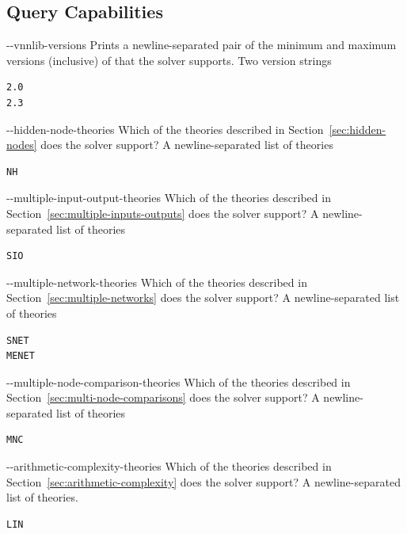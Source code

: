 \subsection{\vnnlib{} Query Capabilities}
\label{sec:query-capabilities}

\clOutputOption
{{-}-vnnlib-versions}
{Prints a newline-separated pair of the minimum and maximum versions (inclusive) of \vnnlib{} that the solver supports.}
{Two version strings}
\begin{lstlisting}[style=bash]
%*\exampleSolver* supports --vnnlib-versions
2.0
2.3
\end{lstlisting}

\clOutputOption
{{-}-hidden-node-theories}
{Which of the \hiddenNodes{} theories described in Section~\ref{sec:hidden-nodes} does the solver support?}
{A newline-separated list of theories}
\begin{lstlisting}[style=bash]
%*\exampleSolver* supports --hidden-node-theories
NH
\end{lstlisting}

\clOutputOption
{{-}-multiple-input-output-theories}
{Which of the \multiIO{} theories described in Section~\ref{sec:multiple-inputs-outputs} does the solver support?}
{A newline-separated list of theories}
\begin{lstlisting}[style=bash]
%*\exampleSolver* supports --multiple-input-output-theories
SIO
\end{lstlisting}

\clOutputOption
{{-}-multiple-network-theories}
{Which of the \multiNetwork{} theories described in Section~\ref{sec:multiple-networks} does the solver support?}
{A newline-separated list of theories}
\begin{lstlisting}[style=bash]
%*\exampleSolver* supports --multiple-network-theories
SNET
MENET
\end{lstlisting}

\clOutputOption
{{-}-multiple-node-comparison-theories}
{Which of the \multiComparison{} theories described in Section~\ref{sec:multi-node-comparisons} does the solver support?}
{A newline-separated list of theories}
\begin{lstlisting}[style=bash]
%*\exampleSolver* supports --multiple-node-comparison-theories
MNC
\end{lstlisting}

\clOutputOption
{{-}-arithmetic-complexity-theories}
{Which of the \arithComplexity{} theories described in Section~\ref{sec:arithmetic-complexity} does the solver support?
}
{A newline-separated list of theories.}
\begin{lstlisting}[style=bash]
%*\exampleSolver* supports --arithmetic-complexity-theories
LIN
\end{lstlisting}

